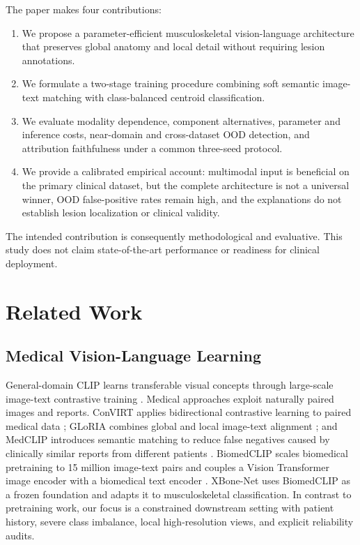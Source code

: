 \documentclass[runningheads]{llncs}
\begin{document}
The paper makes four contributions:
\begin{enumerate}
    \item We propose a parameter-efficient musculoskeletal vision-language architecture that preserves global anatomy and local detail without requiring lesion annotations.
    \item We formulate a two-stage training procedure combining soft semantic image-text matching with class-balanced centroid classification.
    \item We evaluate modality dependence, component alternatives, parameter and inference costs, near-domain and cross-dataset OOD detection, and attribution faithfulness under a common three-seed protocol.
    \item We provide a calibrated empirical account: multimodal input is beneficial on the primary clinical dataset, but the complete architecture is not a universal winner, OOD false-positive rates remain high, and the explanations do not establish lesion localization or clinical validity.
\end{enumerate}

The intended contribution is consequently methodological and evaluative. This study does not claim state-of-the-art performance or readiness for clinical deployment.

\section{Related Work}

\subsection{Medical Vision-Language Learning}

General-domain CLIP learns transferable visual concepts through large-scale image-text contrastive training \cite{CLIP}. Medical approaches exploit naturally paired images and reports. ConVIRT applies bidirectional contrastive learning to paired medical data \cite{ConVIRT}; GLoRIA combines global and local image-text alignment \cite{GLoRIA}; and MedCLIP introduces semantic matching to reduce false negatives caused by clinically similar reports from different patients \cite{MedCLIP}. BiomedCLIP scales biomedical pretraining to 15 million image-text pairs and couples a Vision Transformer image encoder with a biomedical text encoder \cite{BiomedCLIP}. XBone-Net uses BiomedCLIP as a frozen foundation and adapts it to musculoskeletal classification. In contrast to pretraining work, our focus is a constrained downstream setting with patient history, severe class imbalance, local high-resolution views, and explicit reliability audits.
\end{document}
